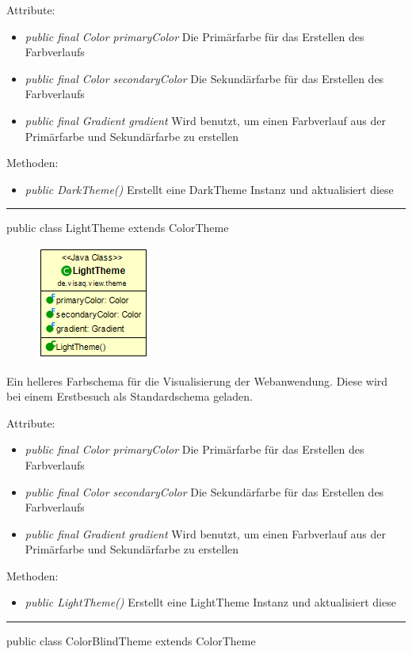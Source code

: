 Attribute:
\begin{itemize}
    \item \emph{public final Color primaryColor} Die Primärfarbe für das Erstellen des Farbverlaufs
    \item \emph{public final Color secondaryColor} Die Sekundärfarbe für das Erstellen des Farbverlaufs
    \item \emph{public final Gradient gradient} Wird benutzt, um einen Farbverlauf aus der Primärfarbe und Sekundärfarbe zu erstellen
\end{itemize}
Methoden:
\begin{itemize} 
    \item \emph{public DarkTheme()} Erstellt eine DarkTheme Instanz und aktualisiert diese
\end{itemize}
\clearpage %
\rule{\textwidth}{0.4pt}
public class LightTheme extends ColorTheme

\begin{minipage}{0.3\textwidth}
    \begin{figure}[H]
        \includegraphics[scale = 0.5]{media/frontend/view/de.view.elements.theme/LightTheme_Class.png}
    \end{figure}
    \end{minipage} \hfill
    \begin{minipage}{0.6\textwidth}
        Ein helleres Farbschema für die Visualisierung der Webanwendung. Diese wird bei einem Erstbesuch als Standardschema geladen.
    \end{minipage}

    Attribute:
    \begin{itemize}
        \item \emph{public final Color primaryColor} Die Primärfarbe für das Erstellen des Farbverlaufs
        \item \emph{public final Color secondaryColor} Die Sekundärfarbe für das Erstellen des Farbverlaufs
        \item \emph{public final Gradient gradient} Wird benutzt, um einen Farbverlauf aus der Primärfarbe und Sekundärfarbe zu erstellen
    \end{itemize}
Methoden:
\begin{itemize} 
    \item \emph{public LightTheme()} Erstellt eine LightTheme Instanz und aktualisiert diese
\end{itemize}
\clearpage %
\rule{\textwidth}{0.4pt}
public class ColorBlindTheme extends ColorTheme

